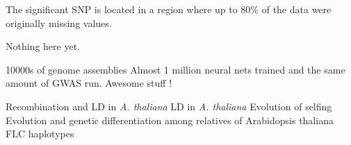 The significant SNP is located in a region where up to 80\% of the data were originally
missing values. 





Nothing here yet.

10000s of genome assemblies
Almost 1 million neural nets trained and the same amount of GWAS run.
Awesome stuff ! 



Recombination and LD in \textit{A. thaliana} \cite{kim2007recombination}
LD in \textit{A. thaliana} \cite{nordborg2002extent}
Evolution of selfing \cite{tang2007evolution}
Evolution and genetic differentiation among relatives of Arabidopsis thaliana \cite{koch2007evolution}
FLC haplotypes \cite{li2014multiple}







